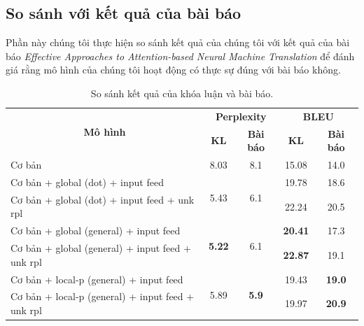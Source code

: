 \subsection{So sánh với kết quả của bài báo}
Phần này chúng tôi thực hiện so sánh kết quả của chúng tôi với kết quả của bài báo \textit{Effective Approaches to Attention-based Neural Machine Translation} \cite{attentionThangLuong2015} để đánh giá rằng mô hình của chúng tôi hoạt động có thực sự đúng với bài báo không.

\begin{table}
	\centering
	\caption{So sánh kết quả của khóa luận và bài báo.}
	\begin{tabular}{|l|c|c|c|c|} 
		\hline
		\multicolumn{1}{|c|}{\multirow{2}{*}{\textbf{Mô hình} }} & \multicolumn{2}{c|}{\textbf{Perplexity }}    & \multicolumn{2}{c|}{\textbf{BLEU }}  \\ 
		\cline{2-5}
		\multicolumn{1}{|c|}{}                                   & \textbf{KL}           & \textbf{Bài báo}     & \textbf{KL}    & \textbf{Bài báo}    \\ 
		\hline
		Cơ bản                                                   & 8.03                  & 8.1                  & 15.08          & 14.0                \\ 
		\hline
		Cơ bản + global (dot) + input feed                       & \multirow{2}{*}{5.43} & \multirow{2}{*}{6.1} & 19.78          & 18.6                \\ 
		\cline{1-1}\cline{4-5}
		Cơ bản + global (dot) + input feed + unk rpl             &                       &                      & 22.24          & 20.5                \\ 
		\hline
		Cơ bản + global (general) + input feed                   & \multirow{2}{*}{\textbf{5.22}} & \multirow{2}{*}{6.1} & \textbf{20.41} & 17.3                \\ 
		\cline{1-1}\cline{4-5}
		Cơ bản + global (general) + input feed + unk rpl         &                       &                      & \textbf{22.87} & 19.1                \\ 
		\hline
		Cơ bản + local-p (general) + input feed                  & \multirow{2}{*}{5.89} & \multirow{2}{*}{\textbf{5.9}} & 19.43          & \textbf{19.0}       \\ 
		\cline{1-1}\cline{4-5}
		Cơ bản + local-p (general) + input feed + unk rpl        &                       &                      & 19.97          & \textbf{20.9}       \\
		\hline
	\end{tabular}
	\label{tab_thesis-paper}
\end{table}

